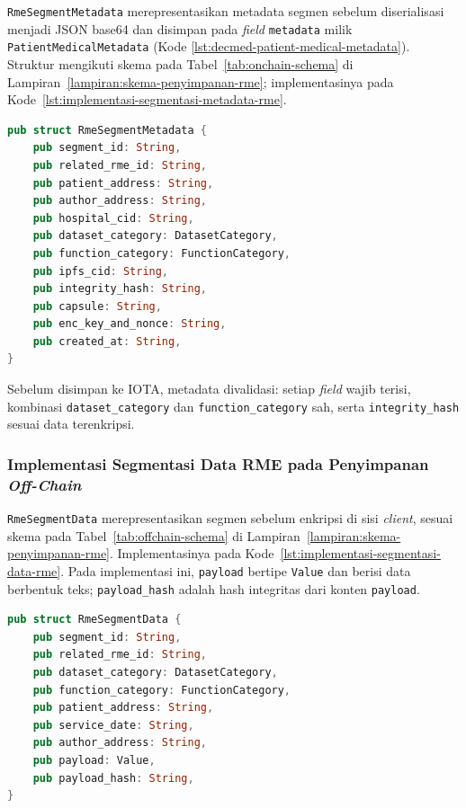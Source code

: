 \texttt{RmeSegmentMetadata} merepresentasikan metadata segmen sebelum diserialisasi menjadi JSON base64 dan disimpan pada \textit{field} \texttt{metadata} milik \texttt{PatientMedicalMetadata} (Kode \ref{lst:decmed-patient-medical-metadata}). Struktur mengikuti skema pada Tabel~\ref{tab:onchain-schema} di Lampiran~\ref{lampiran:skema-penyimpanan-rme}; implementasinya pada Kode~\ref{lst:implementasi-segmentasi-metadata-rme}.

\begin{lstlisting}[language=Rust, caption=Implementasi struktur \texttt{RmeSegmentMetadata} pada \textit{crate} \texttt{decmed-rme-segment}, label={lst:implementasi-segmentasi-metadata-rme}]
pub struct RmeSegmentMetadata {
	pub segment_id: String,
	pub related_rme_id: String,
	pub patient_address: String,
	pub author_address: String,
	pub hospital_cid: String,
	pub dataset_category: DatasetCategory,
	pub function_category: FunctionCategory,
	pub ipfs_cid: String,
	pub integrity_hash: String,
	pub capsule: String,
	pub enc_key_and_nonce: String,
	pub created_at: String,
}
\end{lstlisting}

Sebelum disimpan ke IOTA, metadata divalidasi: setiap \textit{field} wajib terisi, kombinasi \texttt{dataset\_category} dan \texttt{function\_category} sah, serta \texttt{integrity\_hash} sesuai data terenkripsi.

\subsubsection{Implementasi Segmentasi Data RME pada Penyimpanan \textit{Off-Chain}}
\label{subsec:implementasi-segmentasi-data-rme-offchain}

\texttt{RmeSegmentData} merepresentasikan segmen sebelum enkripsi di sisi \textit{client}, sesuai skema pada Tabel~\ref{tab:offchain-schema} di Lampiran~\ref{lampiran:skema-penyimpanan-rme}. Implementasinya pada Kode~\ref{lst:implementasi-segmentasi-data-rme}. Pada implementasi ini, \texttt{payload} bertipe \texttt{Value} dan berisi data berbentuk teks; \texttt{payload\_hash} adalah hash integritas dari konten \texttt{payload}.

\begin{lstlisting}[language=Rust, caption=Implementasi struktur \texttt{RmeSegmentData} pada \textit{crate} \texttt{decmed-rme-segment}, label={lst:implementasi-segmentasi-data-rme}]
pub struct RmeSegmentData {
    pub segment_id: String,
    pub related_rme_id: String,
    pub dataset_category: DatasetCategory,
    pub function_category: FunctionCategory,
    pub patient_address: String,
    pub service_date: String,
    pub author_address: String,
    pub payload: Value,
    pub payload_hash: String,
}
\end{lstlisting}

